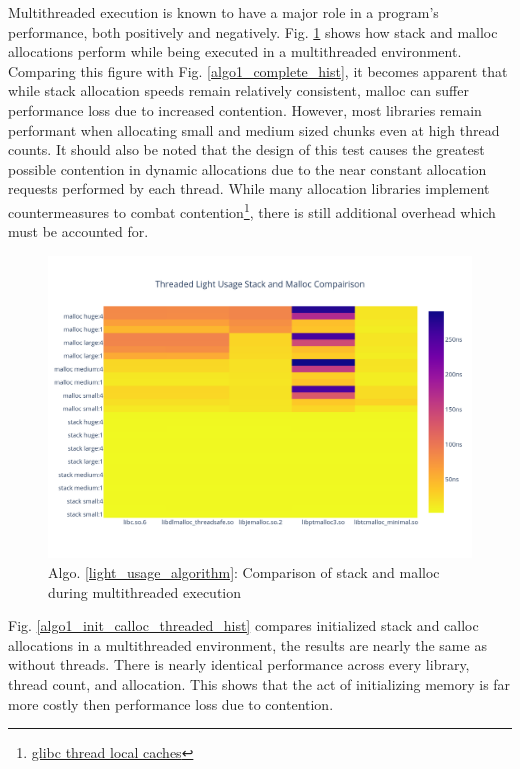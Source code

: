 \documentclass[letterpaper, 10 pt, conference]{ieeeconf}  %
\begin{document}
Multithreaded execution is known to have a major role in a program's performance, both positively and negatively.
Fig. \ref{algo1_stack_malloc_threaded_hist} shows how stack and malloc allocations perform while being executed in a multithreaded environment.
Comparing this figure with Fig. \ref{algo1_complete_hist}, it becomes apparent that while stack allocation speeds remain relatively consistent, malloc can suffer performance loss due to increased contention.
However, most libraries remain performant when allocating small and medium sized chunks even at high thread counts.
It should also be noted that the design of this test causes the greatest possible contention in dynamic allocations due to the near constant allocation requests performed by each thread. 
While many allocation libraries implement countermeasures to combat contention\footnote{\href{https://sourceware.org/glibc/wiki/MallocInternals\#Thread\_Local\_Cache\_.28tcache.29}{glibc thread local caches}}, there is still additional overhead which must be accounted for.

\begin{figure}[tbh!]
  \centering
  \includegraphics[width=\columnwidth]{graphs/light_stack_malloc_threaded_hist.png}
  \caption{ Algo. \ref{light_usage_algorithm}: Comparison of stack and malloc during multithreaded execution }
  \label{algo1_stack_malloc_threaded_hist}
\end{figure}

Fig. \ref{algo1_init_calloc_threaded_hist} compares initialized stack and calloc allocations in a multithreaded environment, the results are nearly the same as without threads.
There is nearly identical performance across every library, thread count, and allocation.
This shows that  the act of initializing memory is far more costly then performance loss due to contention.
\end{document}
